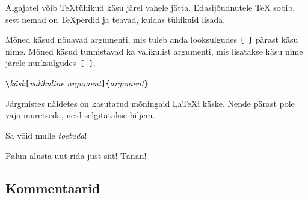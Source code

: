 \begin{example}
Algajatel võib \TeX tühikud käsu
järel vahele jätta. %
Edasijõudnutele \TeX{} sobib, sest
nemad on \TeX perdid ja teavad,
kuidas tühikuid lisada. %
\end{example}

Mõned käsud nõuavad argumenti, mis tuleb anda
looksulgudes \verb|{ }| pärast käsu nime. Mõned käsud
tunnistavad ka valikulist argumenti, mis lisatakse
käsu nime järele nurksulgudes~\verb|[ ]|.
\begin{code}
\verb|\|\textit{käsk}\verb|[|\textit{valikuline argument}\verb|]{|\textit{argument}\verb|}|
\end{code}
Järgmistes näidetes on kasutatud mõningaid \LaTeX i käske. Nende pärast
pole vaja muretseda, neid selgitatakse hiljem.

\begin{example}
Sa võid mulle \textsl{toetuda}!
\end{example}
\begin{example}
Palun alusta uut rida
just siit!\newline
Tänan!
\end{example}

\subsection{Kommentaarid}

